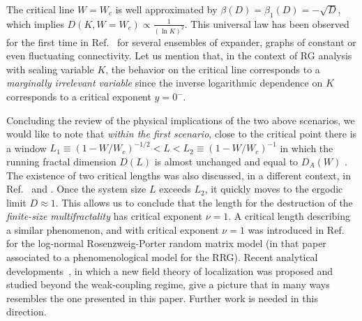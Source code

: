 \documentclass[reprint,aps,prl,superscriptaddress,english,nolongbibliography]{revtex4-2}
\begin{document}
{The critical line $W=W_c$ is well approximated by $\beta(D)=\beta_1(D)=-\sqrt{D}$, which implies $D(K, W=W_c)\propto\frac{1}{(\ln K)^2}$. This universal law has been observed for the first time in Ref.~\cite{sierant2023universality} for several ensembles of expander, graphs of constant or even fluctuating connectivity. Let us mention that, in the context of RG analysis with scaling variable $K$, the behavior on the critical line corresponds to a {\it marginally irrelevant variable} since the inverse logarithmic dependence on $K$ corresponds to a critical exponent $y=0^{-}$.

Concluding the review of the physical implications of the two above scenarios, we would like to note that {\it within the first scenario}, close to the critical point there is a window $L_1\equiv(1-W/W_c)^{-1/2}<L<L_2\equiv (1-W/W_c)^{-1}$ in which the running fractal dimension $D(L)$ is almost unchanged and equal to $D_{A}(W)$ \cite{sierant2023universality}. The existence of two critical lengths was also discussed, in a different context, in Ref.~\cite{Mata2020two} and \cite{arenz2023wegner}. Once the system size $L$ exceeds $L_2$, it quickly moves to the ergodic limit $D\approx 1$. This allows us to conclude that the length for the destruction of the {\it finite-size multifractality} has critical exponent $\nu=1$. A critical length describing a similar phenomenon, and with critical exponent $\nu=1$ was introduced in Ref.~\cite{Khay-Krav2021} for the log-normal Rosenzweig-Porter random matrix model (in that paper associated to a phenomenological model for the RRG). Recent analytical developments~\cite{arenz2023wegner,zirnbauer2023wegner}, in which a new field theory of localization was proposed and studied beyond the weak-coupling regime, give a picture that in many ways resembles the one presented in this paper. Further work is needed in this direction.

}
\end{document}

